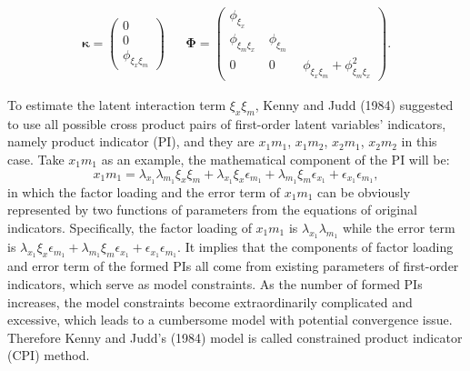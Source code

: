 \documentclass[
  11pt,
  man]{apa6}
\begin{document}
\begin{align}
  \boldsymbol{\kappa} = 
  \begin{pmatrix}
    0 \\
    0 \\
    \phi_{\xi_{x}\xi_{m}}
  \end{pmatrix} &&
  \boldsymbol{\Phi} = 
  \begin{pmatrix}
    \phi_{\xi_{x}} & \ & \ \\
    \phi_{\xi_{m}\xi_{x}} & \ \phi_{\xi_{m}} \ \\
    0 & \ 0 & \ \phi_{\xi_{x}\xi_{m}} + \phi_{\xi_{m}\xi_{x}}^2
  \end{pmatrix}.
\end{align}

To estimate the latent interaction term \(\xi_{x}\xi_{m}\), Kenny and Judd (1984) suggested to use all possible cross product pairs of first-order latent variables' indicators, namely product indicator (PI), and they are \(x_{1}m_{1}\), \(x_{1}m_{2}\), \(x_{2}m_{1}\), \(x_{2}m_{2}\) in this case. Take \(x_{1}m_{1}\) as an example, the mathematical component of the PI will be:
\begin{equation}
x_{1}m_{1} = \lambda_{x_{1}}\lambda_{m_{1}}\xi_{x}\xi_{m} + \lambda_{x_{1}}\xi_{x}\epsilon_{m_{1}} + \lambda_{m_{1}}\xi_{m}\epsilon_{x_{1}} + \epsilon_{x_{1}}\epsilon_{m_{1}},
\end{equation}
in which the factor loading and the error term of \(x_{1}m_{1}\) can be obviously represented by two functions of parameters from the equations of original indicators. Specifically, the factor loading of \(x_{1}m_{1}\) is \(\lambda_{x_{1}}\lambda_{m_{1}}\) while the error term is \(\lambda_{x_{1}}\xi_{x}\epsilon_{m_{1}} + \lambda_{m_{1}}\xi_{m}\epsilon_{x_{1}} + \epsilon_{x_{1}}\epsilon_{m_{1}}\). It implies that the components of factor loading and error term of the formed PIs all come from existing parameters of first-order indicators, which serve as model constraints. As the number of formed PIs increases, the model constraints become extraordinarily complicated and excessive, which leads to a cumbersome model with potential convergence issue. Therefore Kenny and Judd's (1984) model is called constrained product indicator (CPI) method.
\end{document}
